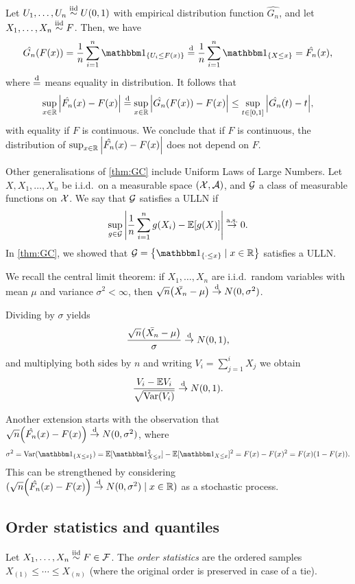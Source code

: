 Let $U_1, \dotsc, U_n \overset{\mathrm{iid}}{\sim} U(0, 1)$ with empirical distribution function $\hat{G_n}$, and let $X_1, \dotsc, X_n \overset{\mathrm{iid}}{\sim} F$. Then, we have
\begin{align*}
\hat{G_n}(F(x)) = \frac1n \sum_{i=1}^n \ind_\qty{U_i \leq F(x)} \deq \frac1n \sum_{i=1}^n \ind_\qty{X \leq x} = \hat{F_n}(x), 
\end{align*}
where $\overset{\mathrm{d}}=$ means equality in distribution. It follows that
\[
\sup_{x \in \mathbb R} \abs{\hat{F_n}(x) - F(x)} \overset{\mathrm{d}}= \sup_{x \in \mathbb R} \abs{\hat{G_n}(F(x)) - F(x)} \leq \sup_{t \in [0, 1]} \abs{\hat{G_n}(t) - t},
\]
with equality if $F$ is continuous. We conclude that if $F$ is continuous, the distribution of $\sup_{x \in \mathbb R} \abs{\hat{F_n}(x) - F(x)}$ does not depend on $F$. 

Other generalisations of \cref{thm:GC} include Uniform Laws of Large Numbers. Let $X, X_1, \dotsc, X_n$ be i.i.d.\ on a measurable space $(\mathcal X, \mathcal A)$, and $\mathcal G$ a class of measurable functions on $\mathcal X$. We say that $\mathcal G$ satisfies a ULLN if 
\[
\sup_{g \in \mathcal G} \abs{\frac1n \sum_{i=1}^n g(X_i) - \mathbb E[g(X)]} \overset{\mathrm{a.s.}}{\to} 0. 
\]
In \cref{thm:GC}, we showed that $\Cal  G = \qty{ \ind_\qty{\cdot \leq x} \mid x \in \RR}$ satisfies a ULLN. 

\begin{recap}
    We recall the central limit theorem: if $X_1, \dotsc, X_n$ are i.i.d.\ random variables with mean $\mu$ and variance $\sigma^2 < \infty$, then $\sqrt n \qty(\bar{X_n} - \mu) \overset{\mathrm{d}}{\to} N(0, \sigma^2)$. 
    
    Dividing by $\sigma$ yields
    \[
    \frac{\sqrt n \qty(\bar{X_n} - \mu)}{\sigma} \overset{\mathrm{d}}{\to} N(0, 1), 
    \]
    and multiplying both sides by $n$ and writing $V_i = \sum_{j=1}^i X_j$ we obtain
    \[
    \frac{V_i - \mathbb E V_i}{\sqrt{\operatorname{Var}(V_i)}} \overset{\mathrm{d}}{\to} N(0, 1).
    \]
\end{recap}
Another extension starts with the observation that $\sqrt n \qty(\hat{F_n}(x) - F(x)) \overset{\mathrm{d}}{\to} N(0, \sigma^2)$, where
\[
\sigma^2 = \Var(\ind_\qty{X \leq x}) = \EE[\ind_{X \leq x}^2] - \EE[\ind_{X \leq x}]^2 = F(x) - F(x)^2 = F(x)(1 - F(x)). 
\]
This can be strengthened by considering $(\sqrt n \qty(\hat{F_n}(x) - F(x)) \overset{\mathrm{d}}{\to} N(0, \sigma^2) \mid x \in \mathbb R)$ as a stochastic process. 

\subsection{Order statistics and quantiles}
\begin{definition}
    Let $X_1, \dotsc, X_n \overset{\mathrm{iid}}{\sim} F \in \mathcal F$. The \emph{order statistics} are the ordered samples $X_{(1)} \leq \dotsb \leq X_{(n)}$ (where the original order is preserved in case of a tie). 
\end{definition}

